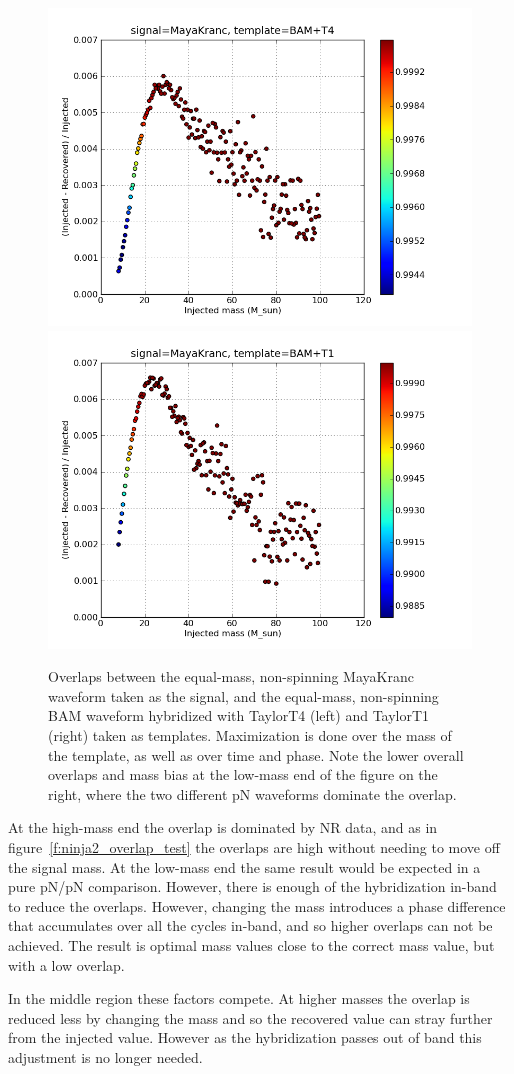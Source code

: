 \begin{figure}
  \includegraphics[width=0.5\linewidth]{figures/ninja2/maya_bamt4_max_over_m}
  \includegraphics[width=0.5\linewidth]{figures/ninja2/maya_bamt1_max_over_m}
  \caption[Overlaps between NINJA-2 submissions maximized over mass]{
  \label{f:ninja2_max_over_mass_bam}
Overlaps between the equal-mass, non-spinning MayaKranc waveform taken
as the signal, and the equal-mass, non-spinning BAM waveform
hybridized with TaylorT4 (left) and TaylorT1 (right) taken as
templates.  Maximization is done over the mass of the template, as well
as over time and phase.  Note the lower overall overlaps and mass bias
at the low-mass end of the figure on the right, where the two different
pN waveforms dominate the overlap.}
\end{figure}%

At the high-mass end the overlap is dominated by NR data, and as in
figure~\ref{f:ninja2_overlap_test} the overlaps are high without
needing to move off the signal mass.  At the low-mass end the same
result would be expected in a pure pN/pN comparison.  However, there
is enough of the hybridization in-band to reduce the overlaps.  However,
changing the mass introduces a phase difference that accumulates over
all the cycles in-band, and so higher overlaps can not be achieved.
The result is optimal mass values close to the correct mass value, but
with a low overlap.

In the middle region these factors compete.  At higher masses the
overlap is reduced less by changing the mass and so the recovered
value can stray further from the injected value.  However as the
hybridization passes out of band this adjustment is no longer needed.


\noindent {}





